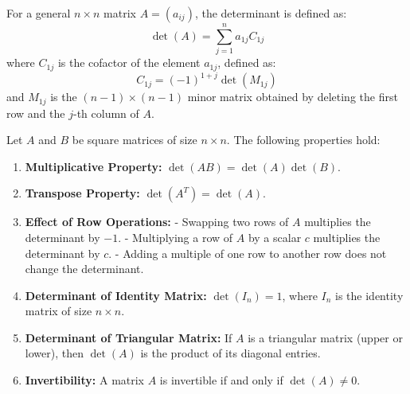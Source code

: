\documentclass[openany]{book}
\begin{document}
For a general $n \times n$ matrix $A = (a_{ij})$, the determinant is defined as:
\[\boxed{
\det(A) = \sum_{j=1}^{n} a_{1j} C_{1j}}
\]
where $C_{1j}$ is the cofactor of the element $a_{1j}$, defined as:
\[
C_{1j} = (-1)^{1+j} \det(M_{1j})
\]
and $M_{1j}$ is the $(n-1) \times (n-1)$ minor matrix obtained by deleting the first row and the $j$-th column of $A$.
\begin{mytheorem}
Let $A$ and $B$ be square matrices of size $n \times n$. The following properties hold:
\begin{enumerate}
    \item \textbf{Multiplicative Property:} $\det(AB) = \det(A)\det(B)$.
    \item \textbf{Transpose Property:} $\det(A^T) = \det(A)$.
    \item \textbf{Effect of Row Operations:}
        - Swapping two rows of $A$ multiplies the determinant by $-1$.
        - Multiplying a row of $A$ by a scalar $c$ multiplies the determinant by $c$.
        - Adding a multiple of one row to another row does not change the determinant.
    \item \textbf{Determinant of Identity Matrix:} $\det(I_n) = 1$, where $I_n$ is the identity matrix of size $n \times n$.
    \item \textbf{Determinant of Triangular Matrix:} If $A$ is a triangular matrix (upper or lower), then $\det(A)$ is the product of its diagonal entries.
    \item \textbf{Invertibility:} A matrix $A$ is invertible if and only if $\det(A) \neq 0$.
\end{enumerate}
\end{mytheorem}
\end{document}
